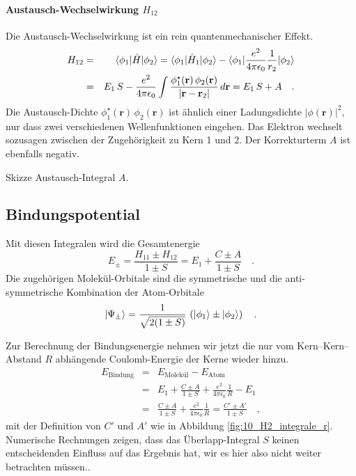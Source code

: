 \paragraph{Austausch-Wechselwirkung $H_{12}$} 
Die Austausch-Wechselwirkung ist ein rein quantenmechanischer Effekt.
\begin{eqnarray}
H_{12} &= &  \braket{\phi_1 | \hat{H} | \phi_2} = \braket{\phi_1 | \hat{H}_1 | \phi_2}  - \braket{\phi_1 |  \frac{e^2}{4 \pi \epsilon_0} \frac{1}{r_{2}} | \phi_2}  \\
 & = & E_1 \, S - \frac{e^2}{4 \pi \epsilon_0} \int \frac{ \phi_1^\star(\mathbf{r}) \, \phi_2(\mathbf{r})  }{|\mathbf{r} - \mathbf{r}_2  |} \, d\mathbf{r} = E_1 \, S + A \quad .
\end{eqnarray}
Die Austausch-Dichte $\phi_1^\star(\mathbf{r}) \, \phi_2(\mathbf{r})$ ist ähnlich einer Ladungsdichte $|\phi(\mathbf{r})|^2$, nur dass zwei verschiedenen Wellenfunktionen eingehen. Das Elektron wechselt sozusagen zwischen der Zugehörigkeit zu Kern 1 und 2. Der Korrekturterm $A$ ist ebenfalls negativ.

\begin{marginfigure}
  \caption{Skizze Austausch-Integral $A$.}
  \end{marginfigure}


\subsection{Bindungspotential}

Mit diesen Integralen wird die Gesamtenergie
\begin{equation}
E_\pm = \frac{H_{11} \pm H_{12}}{1 \pm S} = E_1 + \frac{C \pm A}{1 \pm S} \quad .
\end{equation}
Die zugehörigen Molekül-Orbitale sind die symmetrische und die anti-symmetrische Kombination der Atom-Orbitale
\begin{equation}
\ket{\Psi_\pm }= \frac{1}{\sqrt{2 (1 \pm  S)}} \, \left( \ket{\phi_1} \pm \ket{\phi_2} \right) \quad .
\end{equation}

Zur Berechnung der Bindungsenergie nehmen wir jetzt die nur vom Kern--Kern--Abstand $R$ abhängende Coulomb-Energie der Kerne wieder hinzu. 
%
\begin{eqnarray}
 E_\text{Bindung} &=&  E_\text{Molekül} -  E_\text{Atom} \\
  &=&   E_1 + \frac{C \pm A}{1 \pm S} + \frac{e^2}{4 \pi \epsilon_0} \frac{1}{R} - E_1 \\
   &=&\frac{C \pm A}{1 \pm S} + \frac{e^2}{4 \pi \epsilon_0} \frac{1}{R}  = \frac{C' \pm A'}{1 \pm S}  \quad , \label{eq:10_E_bindung_h2p}
\end{eqnarray}
mit der Definition  von $C'$ und $A'$ wie in Abbildung \ref{fig:10_H2_integrale_r}.
Numerische Rechnungen zeigen, dass das Überlapp-Integral $S$ keinen entscheidenden Einfluss auf das Ergebnis hat, wir es hier also nicht weiter betrachten müssen..

